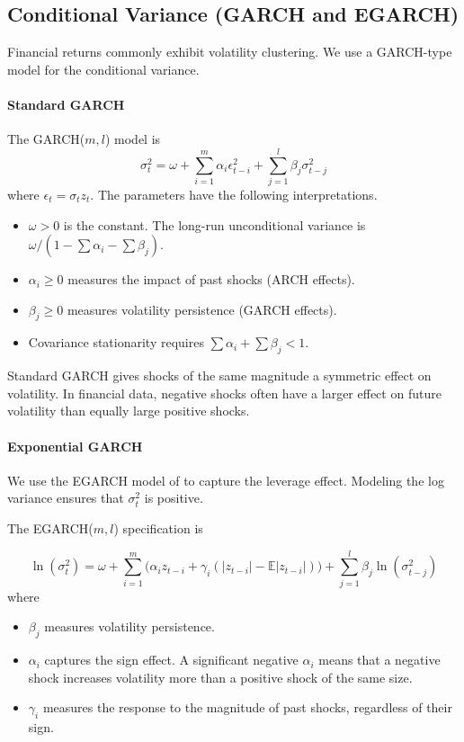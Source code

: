 \documentclass[12pt,a4paper]{article}
\begin{document}
\subsection{Conditional Variance (GARCH and EGARCH)}

Financial returns commonly exhibit volatility clustering. We use a GARCH-type model for the conditional variance.

\paragraph{Standard GARCH}
The GARCH($m,l$) model is
\[
\sigma_t^2 = \omega + \sum_{i=1}^{m} \alpha_i \epsilon_{t-i}^2 + \sum_{j=1}^{l} \beta_j \sigma_{t-j}^2
\]
where $\epsilon_t = \sigma_t z_t$. The parameters have the following interpretations.
\begin{itemize}
  \item $\omega > 0$ is the constant. The long-run unconditional variance is $\omega / (1 - \sum \alpha_i - \sum \beta_j)$.
  \item $\alpha_i \geq 0$ measures the impact of past shocks (ARCH effects).
  \item $\beta_j \geq 0$ measures volatility persistence (GARCH effects).
  \item Covariance stationarity requires $\sum \alpha_i + \sum \beta_j < 1$.
\end{itemize}
Standard GARCH gives shocks of the same magnitude a symmetric effect on volatility. In financial data, negative shocks often have a larger effect on future volatility than equally large positive shocks.

\paragraph{Exponential GARCH}
We use the EGARCH model of \citet{nelson1991} to capture the leverage effect. Modeling the log variance ensures that $\sigma_t^2$ is positive.

The EGARCH($m,l$) specification is

\[
\ln(\sigma_t^2) = \omega + \sum_{i=1}^{m} \big( \alpha_i z_{t-i} + \gamma_i (|z_{t-i}| - \mathbb{E}|z_{t-i}|) \big) + \sum_{j=1}^{l} \beta_j \ln(\sigma_{t-j}^2)
\]
where
\begin{itemize}
  \item $\beta_j$ measures volatility persistence.
  \item $\alpha_i$ captures the sign effect. A significant negative $\alpha_i$ means that a negative shock increases volatility more than a positive shock of the same size.
  \item $\gamma_i$ measures the response to the magnitude of past shocks, regardless of their sign.
\end{itemize}
\end{document}

